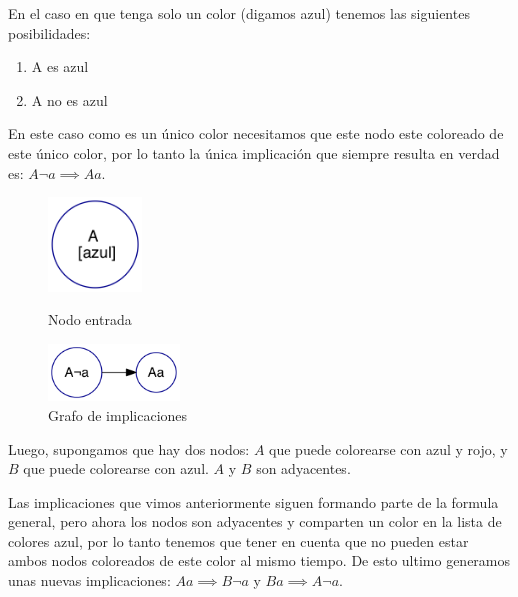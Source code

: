\documentclass{article}
\theoremstyle{definition}
\theoremstyle{remark}
\begin{document}
En el caso en que tenga solo un color (digamos azul) tenemos las siguientes posibilidades:
\begin{enumerate}
\item A es azul
\item A no es azul
\end{enumerate}
En este caso como es un único color necesitamos que este nodo este coloreado de este único color, por lo tanto la única implicación que siempre resulta en verdad es: $A\neg a \implies Aa$.

\begin{figure}
\centering
\begin{minipage}{0.45\textwidth}
\centering
\includegraphics[width=2.5cm]{graphs/ej1/ej1_intro_1c.png}
\caption{Nodo entrada\label{grf:ex1-example-1c}}
\end{minipage}\hfill
\begin{minipage}{0.45\textwidth}
\centering
\includegraphics[width=3.5cm]{graphs/ej1/ej1_intro_1c_impl.png}
\caption{Grafo de implicaciones\label{grf:ex1-example-1c_impl}}
\end{minipage}
\end{figure}

Luego, supongamos que hay dos nodos: $A$ que puede colorearse con azul y rojo, y $B$ que puede colorearse con azul. $A$ y $B$ son adyacentes.

Las implicaciones que vimos anteriormente siguen formando parte de la formula general, pero ahora los nodos son adyacentes y comparten un color en la lista de colores azul, por lo tanto tenemos que tener en cuenta que no pueden estar ambos nodos coloreados de este color al mismo tiempo. De esto ultimo generamos unas nuevas implicaciones: $Aa \implies B\neg a$ y $Ba \implies A\neg a$.
\end{document}

